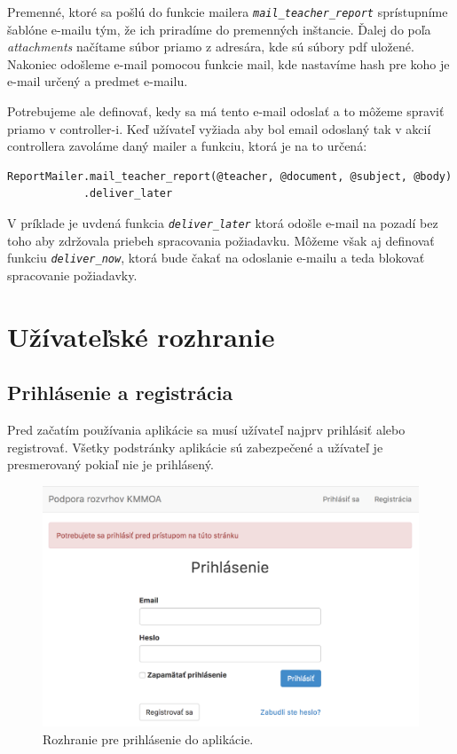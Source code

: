 Premenné, ktoré sa pošlú do funkcie mailera \emph{\texttt{mail\_teacher\_report}} sprístupníme šablóne e-mailu tým, že ich priradíme do premenných inštancie. Ďalej do poľa \emph{attachments} načítame súbor priamo z adresára, kde sú súbory pdf uložené. Nakoniec odošleme e-mail pomocou funkcie mail, kde nastavíme hash pre koho je e-mail určený a predmet e-mailu.

Potrebujeme ale definovať, kedy sa má tento e-mail odoslať a to môžeme spraviť priamo v controller-i. Keď užívateľ vyžiada aby bol email odoslaný tak v akcií controllera zavoláme daný mailer a funkciu, ktorá je na to určená:

\begin{verbatim}
ReportMailer.mail_teacher_report(@teacher, @document, @subject, @body)
            .deliver_later
\end{verbatim}

V príklade je uvdená funkcia \emph{\texttt{deliver\_later}} ktorá odošle e-mail na pozadí bez toho aby zdržovala priebeh spracovania požiadavku. Môžeme však aj definovať funkciu \emph{\texttt{deliver\_now}}, ktorá bude čakať na odoslanie e-mailu a teda blokovať spracovanie požiadavky.

\clearpage
\section{Užívateľské rozhranie}

\subsection{Prihlásenie a registrácia}

Pred začatím používania aplikácie sa musí užívateľ najprv prihlásiť alebo registrovať. Všetky podstránky aplikácie sú zabezpečené a užívateľ je presmerovaný pokiaľ nie je prihlásený.

\begin{figure}[!htb]
  \centering
  \includegraphics[width=1\textwidth]{content/images/login}
  \caption{Rozhranie pre prihlásenie do aplikácie.}
\end{figure}


